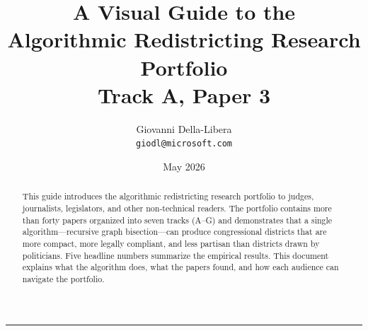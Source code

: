 \documentclass[12pt]{article}
\title{\textbf{A Visual Guide to the\\Algorithmic Redistricting Research Portfolio}\\[6pt]
\large Track A, Paper 3}
\author{Giovanni Della-Libera\\
\small\texttt{giodl@microsoft.com}}
\date{May 2026}
\begin{document}
\maketitle
\thispagestyle{empty}

\begin{abstract}
\noindent
This guide introduces the algorithmic redistricting research portfolio
to judges, journalists, legislators, and other non-technical readers.
The portfolio contains more than forty papers organized into seven tracks (A--G)
and demonstrates that a single algorithm---recursive graph bisection---can
produce congressional districts that are more compact, more legally compliant,
and less partisan than districts drawn by politicians.
Five headline numbers summarize the empirical results.
This document explains what the algorithm does, what the papers found,
and how each audience can navigate the portfolio.
\end{abstract}

\vspace{6pt}
\hrule
\vspace{6pt}

\tableofcontents

\newpage





\label{sec:findings}










\end{document}
